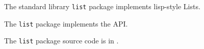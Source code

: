 
The standard library {\tt list} package implements lisp-style Lists.

The {\tt list} package implements the  API.

The {\tt list} package source code is in .




